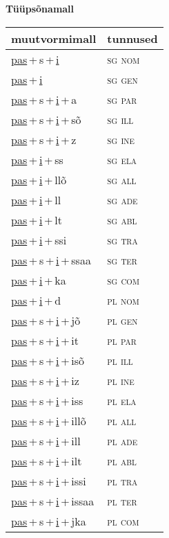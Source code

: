 
\vspace{1.8em}
\begin{minipage}{\textwidth}
\textbf{Tüüpsõnamall \,}\\

\begin{sideways}
\begin{tabular}{l l}
muutvormimall & tunnused \\
\hline
\underline{pas}\,+\,s\,+\,\underline{i} & \textsc{ sg nom } \\
\underline{pas}\,+\,\underline{i} & \textsc{ sg gen } \\
\underline{pas}\,+\,s\,+\,\underline{i}\,+\,a & \textsc{ sg par } \\
\underline{pas}\,+\,s\,+\,\underline{i}\,+\,sõ & \textsc{ sg ill } \\
\underline{pas}\,+\,s\,+\,\underline{i}\,+\,z & \textsc{ sg ine } \\
\underline{pas}\,+\,\underline{i}\,+\,ss & \textsc{ sg ela } \\
\underline{pas}\,+\,\underline{i}\,+\,llõ & \textsc{ sg all } \\
\underline{pas}\,+\,\underline{i}\,+\,ll & \textsc{ sg ade } \\
\underline{pas}\,+\,\underline{i}\,+\,lt & \textsc{ sg abl } \\
\underline{pas}\,+\,\underline{i}\,+\,ssi & \textsc{ sg tra } \\
\underline{pas}\,+\,s\,+\,\underline{i}\,+\,ssaa & \textsc{ sg ter } \\
\underline{pas}\,+\,\underline{i}\,+\,ka & \textsc{ sg com } \\
\underline{pas}\,+\,\underline{i}\,+\,d & \textsc{ pl nom } \\
\underline{pas}\,+\,s\,+\,\underline{i}\,+\,jõ & \textsc{ pl gen } \\
\underline{pas}\,+\,s\,+\,\underline{i}\,+\,it & \textsc{ pl par } \\
\underline{pas}\,+\,s\,+\,\underline{i}\,+\,isõ & \textsc{ pl ill } \\
\underline{pas}\,+\,s\,+\,\underline{i}\,+\,iz & \textsc{ pl ine } \\
\underline{pas}\,+\,s\,+\,\underline{i}\,+\,iss & \textsc{ pl ela } \\
\underline{pas}\,+\,s\,+\,\underline{i}\,+\,illõ & \textsc{ pl all } \\
\underline{pas}\,+\,s\,+\,\underline{i}\,+\,ill & \textsc{ pl ade } \\
\underline{pas}\,+\,s\,+\,\underline{i}\,+\,ilt & \textsc{ pl abl } \\
\underline{pas}\,+\,s\,+\,\underline{i}\,+\,issi & \textsc{ pl tra } \\
\underline{pas}\,+\,s\,+\,\underline{i}\,+\,issaa & \textsc{ pl ter } \\
\underline{pas}\,+\,s\,+\,\underline{i}\,+\,jka & \textsc{ pl com } \\
\end{tabular}
\end{sideways}
\label{tab:tüüpsõnamall-passi}


\end{minipage}
